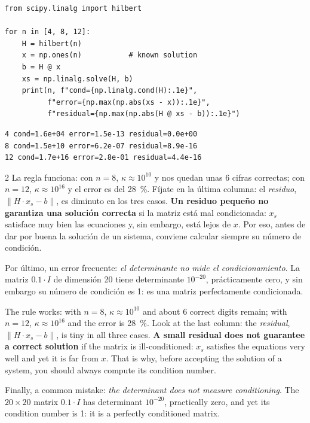 \begin{verbatim}
from scipy.linalg import hilbert

for n in [4, 8, 12]:
    H = hilbert(n)
    x = np.ones(n)           # known solution
    b = H @ x
    xs = np.linalg.solve(H, b)
    print(n, f"cond={np.linalg.cond(H):.1e}",
          f"error={np.max(np.abs(xs - x)):.1e}",
          f"residual={np.max(np.abs(H @ xs - b)):.1e}")
\end{verbatim}
\begin{verbatim}
4 cond=1.6e+04 error=1.5e-13 residual=0.0e+00
8 cond=1.5e+10 error=6.2e-07 residual=8.9e-16
12 cond=1.7e+16 error=2.8e-01 residual=4.4e-16
\end{verbatim}

\begin{paracol}{2}
La regla funciona: con $n=8$, $\kappa\approx 10^{10}$ y nos quedan unas 6 cifras correctas; con $n=12$, $\kappa\approx 10^{16}$ y el error es del 28~\%. Fíjate en la última columna: el \emph{residuo}, $\lVert H\cdot x_s - b\rVert$, es diminuto en los tres casos. \textbf{Un residuo pequeño no garantiza una solución correcta} si la matriz está mal condicionada: $x_s$ satisface muy bien las ecuaciones y, sin embargo, está lejos de $x$. Por eso, antes de dar por buena la solución de un sistema, conviene calcular siempre su número de condición.

Por último, un error frecuente: \emph{el determinante no mide el condicionamiento}. La matriz $0.1\cdot I$ de dimensión 20 tiene determinante $10^{-20}$, prácticamente cero, y sin embargo su número de condición es 1: es una matriz perfectamente condicionada.

\switchcolumn
The rule works: with $n=8$, $\kappa\approx 10^{10}$ and about 6 correct digits remain; with $n=12$, $\kappa\approx 10^{16}$ and the error is 28~\%. Look at the last column: the \emph{residual}, $\lVert H\cdot x_s - b\rVert$, is tiny in all three cases. \textbf{A small residual does not guarantee a correct solution} if the matrix is ill-conditioned: $x_s$ satisfies the equations very well and yet it is far from $x$. That is why, before accepting the solution of a system, you should always compute its condition number.

Finally, a common mistake: \emph{the determinant does not measure conditioning}. The $20\times 20$ matrix $0.1\cdot I$ has determinant $10^{-20}$, practically zero, and yet its condition number is 1: it is a perfectly conditioned matrix.
\end{paracol}



